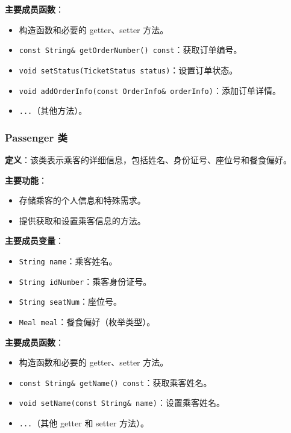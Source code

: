 \documentclass[UTF8, a4paper,12pt]{ctexart}
\begin{document}
\textbf{主要成员函数}：

\begin{itemize}
    \item 构造函数和必要的 getter、setter 方法。
    \item \texttt{const String\& getOrderNumber() const}：获取订单编号。
    \item \texttt{void setStatus(TicketStatus status)}：设置订单状态。
    \item \texttt{void addOrderInfo(const OrderInfo\& orderInfo)}：添加订单详情。
    \item \texttt{...}（其他方法）。
\end{itemize}

\subsubsection{Passenger 类}

\textbf{定义}：该类表示乘客的详细信息，包括姓名、身份证号、座位号和餐食偏好。

\textbf{主要功能}：

\begin{itemize}
    \item 存储乘客的个人信息和特殊需求。
    \item 提供获取和设置乘客信息的方法。
\end{itemize}

\textbf{主要成员变量}：

\begin{itemize}
    \item \texttt{String name}：乘客姓名。
    \item \texttt{String idNumber}：乘客身份证号。
    \item \texttt{String seatNum}：座位号。
    \item \texttt{Meal meal}：餐食偏好（枚举类型）。
\end{itemize}

\textbf{主要成员函数}：

\begin{itemize}
    \item 构造函数和必要的 getter、setter 方法。
    \item \texttt{const String\& getName() const}：获取乘客姓名。
    \item \texttt{void setName(const String\& name)}：设置乘客姓名。
    \item \texttt{...}（其他 getter 和 setter 方法）。
\end{itemize}
\end{document}
